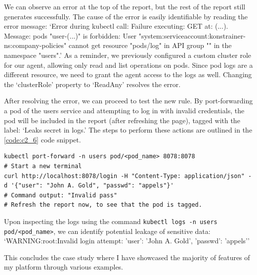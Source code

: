 We can observe an error at the top of the report, but the rest of the report still generates successfully. The cause of the error is easily identifiable by reading the error message: `Error during kubectl call: Failure executing: GET at: (...). Message: pods "user-(...)" is forbidden: User "system:serviceaccount:konstrainer-ns:company-policies" cannot get resource "pods/log" in API group "" in the namespace "users".' As a reminder, we previously configured a custom cluster role for our agent, allowing only read and list operations on pods. Since pod logs are a different resource, we need to grant the agent access to the logs as well. Changing the `clusterRole' property to `ReadAny' resolves the error.

After resolving the error, we can proceed to test the new rule. By port-forwarding a pod of the users service and attempting to log in with invalid credentials, the pod will be included in the report (after refreshing the page), tagged with the label: `Leaks secret in logs.' The steps to perform these actions are outlined in the \ref{code:c2_6} code snippet.

\begin{lstlisting}[caption={Invalid login atempt},language=mybash,label=code:c2_6]
kubectl port-forward -n users pod/<pod_name> 8078:8078
# Start a new terminal
curl http://localhost:8078/login -H "Content-Type: application/json" -d '{"user": "John A. Gold", "passwd": "appels"}'
# Command output: "Invalid pass"
# Refresh the report now, to see that the pod is tagged.
\end{lstlisting}

Upon inspecting the logs using the command \lstinline|kubectl logs -n users pod/<pod_name>|, we can identify potential leakage of sensitive data: `WARNING:root:Invalid login attempt: {'user': 'John A. Gold', 'passwd': 'appels'}'

This concludes the case study where I have showcased the majority of features of my platform through various examples.
